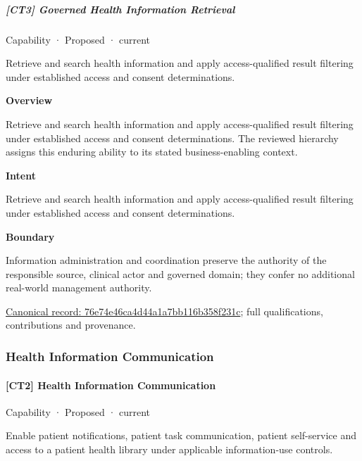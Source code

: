 \subparagraph{[CT3] Governed Health Information Retrieval}

\label{element:76e74e46ca4d44a1a7bb116b358f231c}
{\small Capability · Proposed · current}\par

Retrieve and search health information and apply access-qualified result filtering under established access and consent determinations.



\textbf{Overview}



Retrieve and search health information and apply access-qualified result filtering under established access and consent determinations. The reviewed hierarchy assigns this enduring ability to its stated business-enabling context.



\textbf{Intent}



Retrieve and search health information and apply access-qualified result filtering under established access and consent determinations.



\textbf{Boundary}



Information administration and coordination preserve the authority of the responsible source, clinical actor and governed domain; they confer no additional real-world management authority.


{\footnotesize \href{../../../../continuum/strategy/capability/76e74e46ca4d44a1a7bb116b358f231c.md}{Canonical record: 76e74e46ca4d44a1a7bb116b358f231c}; full qualifications, contributions and provenance.}\par
\subsubsection{Health Information Communication}

\paragraph{[CT2] Health Information Communication}

\label{element:7925605bf60f4b288e826020409a09d9}
{\small Capability · Proposed · current}\par

Enable patient notifications, patient task communication, patient self-service and access to a patient health library under applicable information-use controls.



